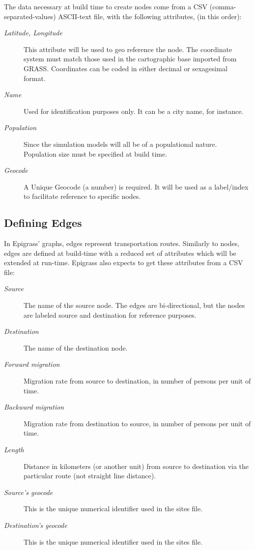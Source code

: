 \documentclass[a4paper,10pt]{manual}
\begin{document}
The data necessary at build time to create nodes come from a CSV (comma-separated-values) ASCII-text file, with the following attributes, (in this order):
\begin{description}
\item[\emph{Latitude, Longitude}]
This attribute will be used to geo reference the  node. The coordinate system must match those used in the cartographic base imported from GRASS. Coordinates can be coded in either decimal or sexagesimal format.

\item[\emph{Name}]
Used for identification purposes only. It can be a city name, for instance.

\item[\emph{Population}]
Since the simulation models will all be of a populational nature. Population size must be specified at build time.

\item[\emph{Geocode}]
A Unique Geocode (a number) is required. It will be used as a label/index to facilitate  reference to specific nodes.

\end{description}

\subsection{Defining Edges}

In Epigrass' graphs, edges represent transportation routes. Similarly to nodes, edges are defined at build-time with a reduced set of attributes which will be extended at run-time. Epigrass also expects to get these attributes from a CSV file:
\begin{description}
\item[\emph{Source}]
The name of the source node. The edges are bi-directional, but the nodes are labeled source and destination for reference purposes.

\item[\emph{Destination}]
The name of the destination node.

\item[\emph{Forward migration}]
Migration rate from source to destination, in number of persons per unit of time.

\item[\emph{Backward migration}]
Migration rate from destination to source, in number of persons per unit of time.

\item[\emph{Length}]
Distance in kilometers (or another unit) from source to destination via the particular route (not straight line distance).

\item[\emph{Source's geocode}]
This is the unique numerical identifier used in the sites file.

\item[\emph{Destination's geocode}]
This is the unique numerical identifier used in the sites file.

\end{description}
\end{document}
